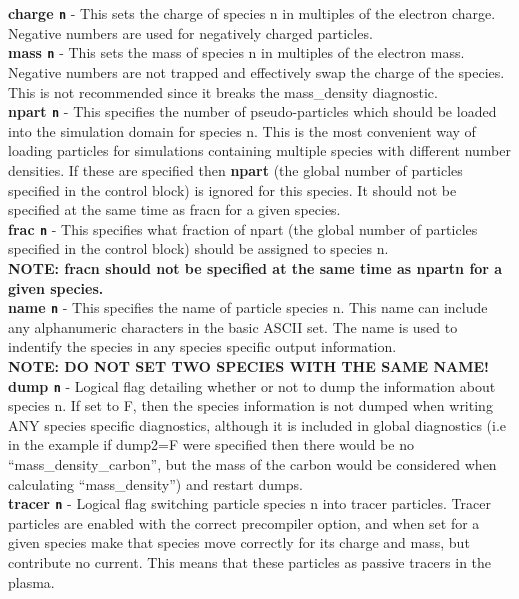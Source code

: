 \documentclass[12pt]{article}
\newcommand{\emphtext}{\color{warwickdark} \fontfamily{phv}\selectfont\Large\bf}
\newcommand{\inlinecode}[1]{{\color{warwickred} \bf\texttt{#1}}}
\newcommand{\inlineemph}[1]{{\color{warwicklight} \bf{#1}}}
\begin{document}
{\emphtext charge\inlinecode{n}} - This sets the charge of species n in
multiples of the electron charge. Negative numbers are used for negatively
charged particles.\\

{\emphtext mass\inlinecode{n}} - This sets the mass of species n in multiples
of the electron mass. Negative numbers are not trapped and effectively swap the
charge of the species. This is not recommended since it breaks the
mass\_density diagnostic.\\

{\emphtext npart\inlinecode{n}} - This specifies the number of pseudo-particles
which should be loaded into the simulation domain for species n. This is the
most convenient way of loading particles for simulations containing multiple
species with different number densities. If these are specified then
\inlineemph{npart} (the global number of particles specified in the control
block) is ignored for this species. It should not be specified at the same time
as fracn for a given species.\\

{\emphtext frac\inlinecode{n}} - This specifies what fraction of npart (the
global number of particles specified in the control block) should be assigned
to species n. \\

{\emphtext NOTE: fracn should not be specified at the same time as npartn for a
given species.}\\

{\emphtext name\inlinecode{n}} - This specifies the name of particle species
n. This name can include any alphanumeric characters in the basic ASCII
set. The name is used to indentify the species in any species specific output
information. \\

{\emphtext NOTE: DO NOT SET TWO SPECIES WITH THE SAME NAME!}\\

{\emphtext dump\inlinecode{n}} - Logical flag detailing whether or not to dump
the information about species n. If set to F, then the species information is
not dumped when writing ANY species specific diagnostics, although it is
included in global diagnostics (i.e in the example if dump2=F were specified
then there would be no ``mass\_density\_carbon'', but the mass of the carbon
would be considered when calculating ``mass\_density'') and restart dumps.\\

{\emphtext tracer\inlinecode{n}} - Logical flag switching particle species n
into tracer particles. Tracer particles are enabled with the correct
precompiler option, and when set for a given species make that species move
correctly for its charge and mass, but contribute no current. This means that
these particles as passive tracers in the plasma.\\
\end{document}
